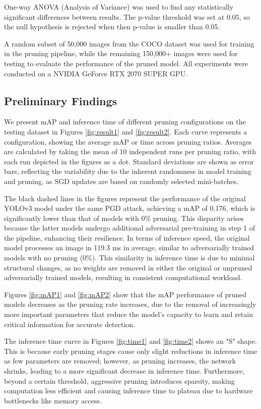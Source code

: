 \documentclass[10pt]{cai}
\begin{document}
One-way ANOVA (Analysis of Variance) was used to find any statistically significant differences between results. The p-value threshold was set at 0.05, so the null hypothesis is rejected when then p-value is smaller than 0.05. 

A random subset of 50,000 images from the COCO dataset was used for training in the pruning pipeline, while the remaining 150,000+ images were used for testing to evaluate the performance of the pruned model. All experiments were conducted on a NVIDIA GeForce RTX 2070 SUPER GPU.


\subsection{Preliminary Findings}
We present mAP and inference time of different pruning configurations on the testing dataset in Figures \ref{fig:result1} and \ref{fig:result2}. Each curve represents a configuration, showing the average mAP or time across pruning ratios. Averages are calculated by taking the mean of 10 independent runs per pruning ratio, with each run depicted in the figures as a dot. Standard deviations are shown as error bars, reflecting the variability due to the inherent randomness in model training and pruning, as SGD updates are based on randomly selected mini-batches.

The black dashed lines in the figures represent the performance of the original YOLOv3 model under the same PGD attack, achieving a mAP of 0.176, which is significantly lower than that of models with 0\% pruning. This disparity arises because the latter models undergo additional adversarial pre-training in step 1 of the pipeline, enhancing their resilience. In terms of inference speed, the original model processes an image in 119.3 ms in average, similar to adversarially trained models with no pruning (0\%). This similarity in inference time is due to minimal structural changes, as no weights are removed in either the original or unpruned adversarially trained models, resulting in consistent computational workload.

Figures \ref{fig:mAP1} and \ref{fig:mAP2} show that the mAP performance of pruned models decreases as the pruning rate increases, due to the removal of increasingly more important parameters that reduce the model's capacity to learn and retain critical information for accurate detection. 

The inference time curve in Figures \ref{fig:time1} and \ref{fig:time2} shows an "S" shape. This is because early pruning stages cause only slight reductions in inference time as few parameters are removed; however, as pruning increases, the network shrinks, leading to a more significant decrease in inference time. Furthermore, beyond a certain threshold, aggressive pruning introduces sparsity, making computation less efficient and causing inference time to plateau due to hardware bottlenecks like memory access.
\end{document}
